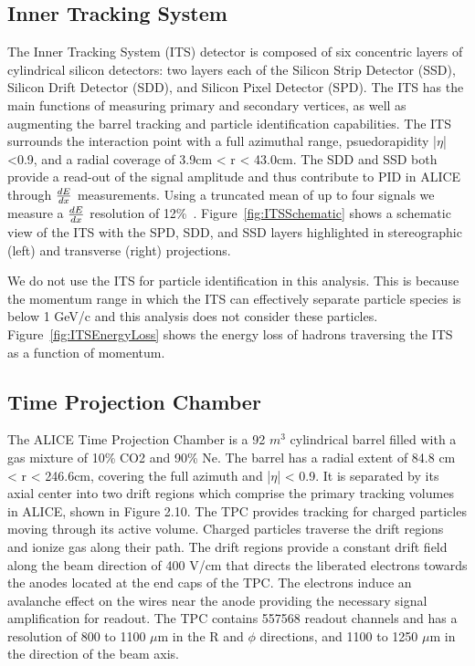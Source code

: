 \subsection*{Inner Tracking System}

The Inner Tracking System (ITS) detector is composed of six concentric layers of cylindrical silicon detectors: two layers each of the Silicon Strip Detector (SSD), Silicon Drift Detector (SDD), and Silicon Pixel Detector (SPD). The ITS has the main functions of measuring primary and secondary vertices, as well as augmenting the barrel tracking and particle identification capabilities. The ITS surrounds the interaction point with a full azimuthal range, psuedorapidity |$\eta$| <0.9, and a radial coverage of 3.9cm < r < 43.0cm. The SDD and SSD both provide a read-out of the signal amplitude and thus contribute to PID in ALICE through $\frac{dE}{dx}$ measurements. Using a truncated mean of up to four signals we measure a $\frac{dE}{dx}$ resolution of 12\%~\cite{}. Figure~\ref{fig:ITSSchematic} shows a schematic view of the ITS with the SPD, SDD, and SSD layers highlighted in stereographic (left) and transverse (right) projections.

We do not use the ITS for particle identification in this analysis. This is because the momentum range in which the ITS can effectively separate particle species is below 1 GeV/c and this analysis does not consider these particles. Figure~\ref{fig:ITSEnergyLoss} shows the energy loss of hadrons traversing the ITS as a function of momentum.

\subsection*{Time Projection Chamber}\label{subsec:TPC}

The ALICE Time Projection Chamber is a 92 $m^3$ cylindrical barrel filled with a gas mixture of 10\% CO2 and 90\% Ne. The barrel has a radial extent of 84.8 cm < r < 246.6cm, covering the full azimuth and |$\eta$| < 0.9. It is separated by its axial center into two drift regions which comprise the primary tracking volumes in ALICE, shown in Figure 2.10. The TPC provides tracking for charged particles moving through its active volume. Charged particles traverse the drift regions and ionize gas along their path. The drift regions provide a constant drift field along the beam direction of 400 V/cm that directs the liberated electrons towards the anodes located at the end caps of the TPC. The electrons induce an avalanche effect on the wires near the anode providing the necessary signal amplification for readout. The TPC contains 557568 readout channels and has a resolution of 800 to 1100 $\mu$m in the R and $\phi$ directions, and 1100 to 1250 $\mu$m in the direction of the beam axis. 

